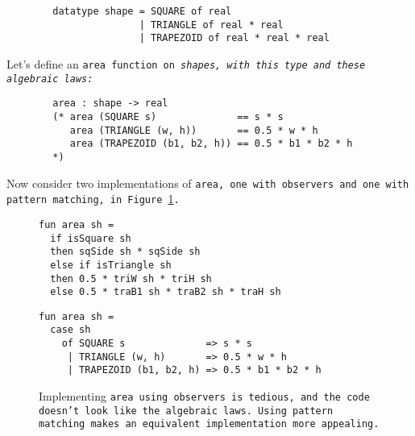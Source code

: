\documentclass[manuscript,screen,review, 12pt, nonacm]{acmart}
\begin{document}
\medskip 
\begin{minipage}[t]{\textwidth}
    \begin{verbatim}
        datatype shape = SQUARE of real 
                       | TRIANGLE of real * real 
                       | TRAPEZOID of real * real * real
\end{verbatim}
\end{minipage}
\medskip 

Let's define an \tt{area} function on \it{shape}s, with this type and these
algebraic laws: 

\medskip 
\begin{minipage}[t]{\textwidth}
    \begin{verbatim}
        area : shape -> real 
        (* area (SQUARE s)              == s * s 
           area (TRIANGLE (w, h))       == 0.5 * w * h
           area (TRAPEZOID (b1, b2, h)) == 0.5 * b1 * b2 * h
        *)
\end{verbatim}
\end{minipage}
\medskip 

Now consider two implementations of \tt{area}, one with observers and one with
pattern matching, in Figure~\ref{fig:area}.

    \begin{figure}[H]
      \begin{minipage}[t]{0.7\textwidth}
        \begin{verbatim}
fun area sh =
  if isSquare sh
  then sqSide sh * sqSide sh
  else if isTriangle sh 
  then 0.5 * triW sh * triH sh
  else 0.5 * traB1 sh * traB2 sh * traH sh
            \end{verbatim}
            \label{fig:observerarea} 
      \end{minipage}
      \vfill
      \begin{minipage}[t]{0.7\textwidth}
        \begin{verbatim}
fun area sh =
  case sh 
    of SQUARE s              => s * s
     | TRIANGLE (w, h)       => 0.5 * w * h
     | TRAPEZOID (b1, b2, h) => 0.5 * b1 * b2 * h
                \end{verbatim}
       \vspace{2.2em}
       \label{fig:pmarea}
      \end{minipage}
      \caption{Implementing \tt{area} using observers is tedious, and the code
      doesn't look like the algebraic laws. Using pattern matching makes an
      equivalent implementation more appealing.}
      \label{fig:area}
    \end{figure}
\end{document}
